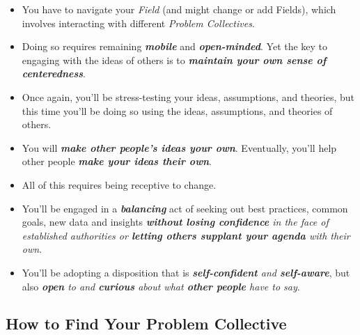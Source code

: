 \documentclass[11pt]{article}
\begin{document}
\begin{itemize}
\item You have to navigate your \emph{Field} (and might change or add Fields), which involves interacting with different \emph{Problem Collectives}.

\item Doing so requires remaining \emph{\textbf{mobile}} and \emph{\textbf{open-minded}}. Yet the key to engaging with the ideas of others is to \emph{\textbf{maintain your own sense of centeredness}}.

\item Once again, you’ll be stress-testing your ideas, assumptions, and theories, but this time you’ll be doing so using the ideas, assumptions, and theories of others.

\item You will \emph{\textbf{make other people’s ideas your own}}. Eventually, you’ll help other people \emph{\textbf{make your ideas their own}}.

\item All of this requires being receptive to change. 

\item You’ll be engaged in a \emph{\textbf{balancing}} act of  seeking out best practices, common goals, new data and insights \emph{\textbf{without losing confidence} in the face of established authorities or \textbf{letting others supplant your agenda} with their own}. 

\item You’ll be adopting a disposition that is \emph{\textbf{self-confident} and \textbf{self-aware}}, but also \emph{\textbf{open} to and \textbf{curious} about what \textbf{other people} have to say}. 
\end{itemize}
   
\subsection{How to Find Your Problem Collective}
\end{document}
